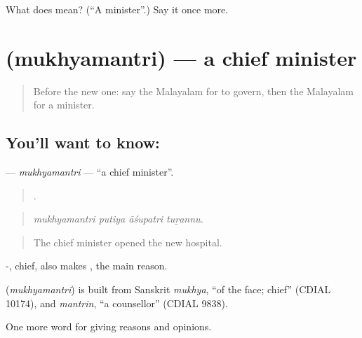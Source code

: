 \begin{tcolorbox}[breakable,colback=teal!4,colframe=teal!35!black,title={Before you move on}]
What does  mean? (\textquotedblleft{}A minister\textquotedblright{}.) Say it once more.
\end{tcolorbox}
\section[\texorpdfstring{\ml{മുഖ്യമന്ത്രി} (mukhyamantri)}{മുഖ്യമന്ത്രി (mukhyamantri)}]{ (mukhyamantri) — a chief minister}

\label{lesson:ML-C421-mukhyamantri}



\begin{quote}
Before the new one: say the Malayalam for to govern, then the Malayalam for a minister.
\end{quote}

\subsection*{You'll want to know: }
\textbf{} — \emph{mukhyamantri} — \textquotedblleft{}a chief minister\textquotedblright{}.

\begin{quote}
   .
\end{quote}

\begin{quote}
\emph{mukhyamantri putiya āśupatri tuṟannu.}
\end{quote}

\begin{quote}
The chief minister opened the new hospital.
\end{quote}

-, chief, also makes  , the main reason.

\begin{cousinweb}
\textbf{} (\emph{mukhyamantri}) is built from Sanskrit \emph{mukhya}, \textquotedblleft{}of the face; chief\textquotedblright{} (CDIAL 10174), and \emph{mantrin}, \textquotedblleft{}a counsellor\textquotedblright{} (CDIAL 9838).
\end{cousinweb}

\begin{grammarlens}[title={What you've built}]
One more word for giving reasons and opinions.
\end{grammarlens}

